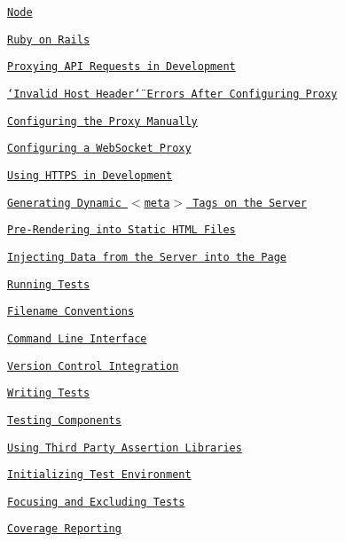 \begin{DoxyItemize}
\begin{DoxyItemize}
\item \href{#node}{\tt Node}
\item \href{#ruby-on-rails}{\tt Ruby on Rails}
\end{DoxyItemize}
\item \href{#proxying-api-requests-in-development}{\tt Proxying A\+PI Requests in Development}
\begin{DoxyItemize}
\item \href{#invalid-host-header-errors-after-configuring-proxy}{\tt \char`\"{}\+Invalid Host Header\char`\"{} Errors After Configuring Proxy}
\item \href{#configuring-the-proxy-manually}{\tt Configuring the Proxy Manually}
\item \href{#configuring-a-websocket-proxy}{\tt Configuring a Web\+Socket Proxy}
\end{DoxyItemize}
\item \href{#using-https-in-development}{\tt Using H\+T\+T\+PS in Development}
\item \href{#generating-dynamic-meta-tags-on-the-server}{\tt Generating Dynamic {\ttfamily $<$meta$>$} Tags on the Server}
\item \href{#pre-rendering-into-static-html-files}{\tt Pre-\/\+Rendering into Static H\+T\+ML Files}
\item \href{#injecting-data-from-the-server-into-the-page}{\tt Injecting Data from the Server into the Page}
\item \href{#running-tests}{\tt Running Tests}
\begin{DoxyItemize}
\item \href{#filename-conventions}{\tt Filename Conventions}
\item \href{#command-line-interface}{\tt Command Line Interface}
\item \href{#version-control-integration}{\tt Version Control Integration}
\item \href{#writing-tests}{\tt Writing Tests}
\item \href{#testing-components}{\tt Testing Components}
\item \href{#using-third-party-assertion-libraries}{\tt Using Third Party Assertion Libraries}
\item \href{#initializing-test-environment}{\tt Initializing Test Environment}
\item \href{#focusing-and-excluding-tests}{\tt Focusing and Excluding Tests}
\item \href{#coverage-reporting}{\tt Coverage Reporting}

\end{DoxyItemize}
\end{DoxyItemize}
